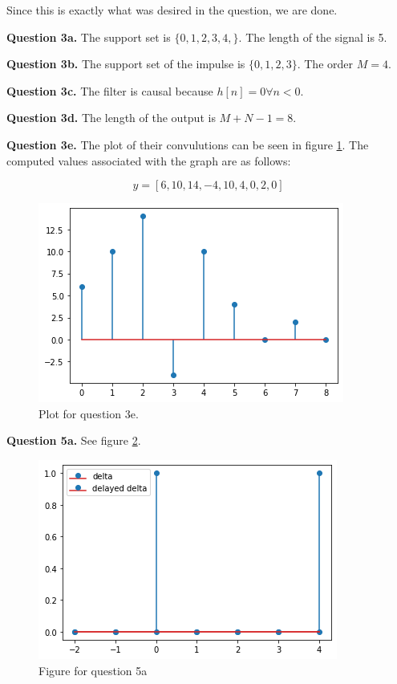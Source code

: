 \documentclass[letterpaper, reqno,11pt]{article}
\begin{document}
Since this is exactly what was desired in the question, we are done. 

{\noindent\bf Question 3a.} The support set is $\{0, 1, 2, 3, 4,\}$. The length of the signal is 5. 

{\noindent\bf Question 3b.} The support set of the impulse is $\{0, 1, 2, 3\}$. The order $M=4$.  

{\noindent\bf Question 3c.} The filter is causal because $h[n]=0\forall n<0$. 

{\noindent\bf Question 3d.} The length of the output is $M+N-1=8$. 

{\noindent\bf Question 3e.} The plot of their convulutions can be seen in figure \ref{fig:3e}. The computed values associated with the graph are as follows: 

$$
    y=[ 6, 10, 14, -4, 10,  4,  0,  2,  0]
$$

\begin{figure}[htbp]
\centering
\includegraphics[width=\textwidth]{3e}
\caption{Plot for question 3e. }
\label{fig:3e}
\end{figure}

{\noindent\bf Question 5a.} See figure \ref{fig:5a}. 

\begin{figure}[htbp]
\centering
\includegraphics[width=\textwidth]{5a}
\caption{Figure for question 5a}
\label{fig:5a}
\end{figure}
\end{document}
